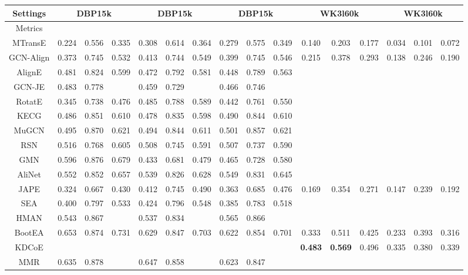 \documentclass[11pt,a4paper]{article}
\def\bhline{\specialrule{.2em}{0em}{0em}}
\begin{document}
{
\begin{table*}[t]
\setlength\tabcolsep{2pt}
\centering
\scriptsize
\begin{tabular}{c|ccc|ccc|ccc|ccc|ccc}
\bhline
Settings&\multicolumn{3}{c|}{DBP15k}&\multicolumn{3}{c|}{DBP15k}&\multicolumn{3}{c|}{DBP15k}&\multicolumn{3}{c|}{WK3l60k}&\multicolumn{3}{c}{WK3l60k}\\
\hline
Metrics&&&&&&&&&&&&&&&\\
\bhline
MTransE \cite{chen2017multigraph}&0.224&0.556&0.335&0.308&0.614&0.364&0.279&0.575&0.349&0.140&0.203&0.177&0.034&0.101&0.072\\
GCN-Align \cite{wang2018cross}&0.373&0.745&0.532&0.413&0.744&0.549&0.399&0.745&0.546&0.215&0.378&0.293&0.138&0.246&0.190\\
AlignE \cite{sun2018bootstrapping}&0.481&0.824&0.599&0.472&0.792&0.581&0.448&0.789&0.563&&&&&&\\
GCN-JE \cite{wu2019jointly}&0.483&0.778&&0.459&0.729&&0.466&0.746&&&&&&&\\
RotatE \cite{sun2019rotate}&0.345&0.738&0.476&0.485&0.788&0.589&0.442&0.761&0.550&&&&&&\\
KECG \cite{li2019semi}&0.486&0.851&0.610&0.478&0.835&0.598&0.490&0.844&0.610&&&&&&\\
MuGCN \cite{cao2019multi}&0.495&0.870&0.621&0.494&0.844&0.611&0.501&0.857&0.621&&&&&&\\
RSN \cite{guo2019learning}&0.516&0.768&0.605&0.508&0.745&0.591&0.507&0.737&0.590&&&&&&\\
GMN \cite{xu2019cross}&0.596&0.876&0.679&0.433&0.681&0.479&0.465&0.728&0.580&&&&&&\\
AliNet \cite{sun2020alinet}&0.552&0.852&0.657&0.539&0.826&0.628&0.549&0.831&0.645&&&&&&\\
\hline
JAPE \cite{sun2017cross}&0.324&0.667&0.430&0.412&0.745&0.490&0.363&0.685&0.476&0.169&0.354&0.271&0.147&0.239&0.192\\
SEA \cite{pei2019deg}&0.400&0.797&0.533&0.424&0.796&0.548&0.385&0.783&0.518&&&&&&\\
HMAN \cite{yang2019aligning}&0.543&0.867&&0.537&0.834&&0.565&0.866&&&&&&&\\
\hline
BootEA \cite{sun2018bootstrapping}&0.653&0.874&0.731&0.629&0.847&0.703&0.622&0.854&0.701&0.333&0.511&0.425&0.233&0.393&0.316\\
KDCoE \cite{chen2018co}&&&&&&&&&&\textbf{0.483}&\textbf{0.569}&0.496&0.335&0.380&0.339\\
MMR \cite{shi2019modeling}&0.635&0.878&&0.647&0.858&&0.623&0.847&&&&&&&\\

\end{tabular}
\end{table*}}
\end{document}
